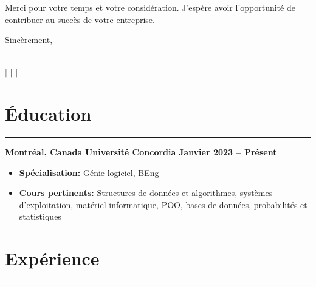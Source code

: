 \documentclass[10pt]{article}
\begin{document}
\vspace{1.5em}
Merci pour votre temps et votre considération. J’espère avoir l’opportunité de contribuer au succès de votre entreprise.

\vspace{2em}
Sincèrement, \\
\fullname


\newpage


\begin{center}
    {\Huge \textbf{\fullname}} \\
    \vspace{1mm}
    {\small 
    \faPhone \hspace{0mm} \href{tel:+15149445977}{\phone} $\vert$ 
    \faEnvelope \hspace{0mm} \href{mailto:massimo02caruso@gmail.com}{\email} $\vert$ 
    \faLinkedin \hspace{0mm} \href{https://linkedin.com/in/massimocaruso}{\linkedin} $\vert$ 
    \faGithub \hspace{0mm} \href{https://github.com/Extinctable}{\github}
    }
\end{center}

\vspace{-8mm}

\section*{Éducation}
\vspace{-2mm}
\hrule
\vspace{0mm}

\textbf{Montréal, Canada} \hfill \textbf{Université Concordia} \hfill \textbf{Janvier 2023 -- Présent} 
\vspace{-4mm}
\begin{itemize}[left=0.15in, itemsep=0pt]
    \item \textbf{Spécialisation:} Génie logiciel, BEng
    \item \textbf{Cours pertinents:} Structures de données et algorithmes, systèmes d'exploitation, matériel informatique, POO, bases de données, probabilités et statistiques
\end{itemize}

\section*{Expérience}
\vspace{-2mm}
\hrule
\vspace{0mm}
\end{document}
